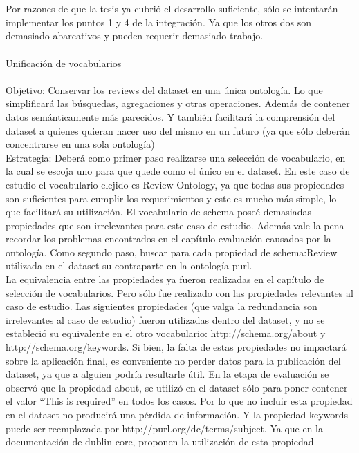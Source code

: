 \\
\\
Por razones de que la tesis ya cubrió el desarrollo suficiente, sólo se intentarán implementar los puntos 1 y 4 de la integración. Ya que 
los otros dos son demasiado abarcativos y pueden requerir demasiado trabajo.\\
\\
Unificación de vocabularios\\
\\
Objetivo: Conservar los reviews del dataset en una única ontología. Lo que simplificará las búsquedas, agregaciones y otras operaciones.
Además de contener datos semánticamente más parecidos. Y también facilitará la comprensión del dataset a quienes quieran hacer uso del mismo
en un futuro (ya que sólo deberán concentrarse en una sola ontología)
\\
Estrategia: Deberá como primer paso realizarse una selección de vocabulario, en la cual se escoja uno para que quede como el único en el dataset.
En este caso de estudio el vocabulario elejido es Review Ontology, ya que todas sus propiedades son suficientes para cumplir los requerimientos y 
este es mucho más simple, lo que facilitará su utilización. El vocabulario de schema poseé demasiadas propiedades que son irrelevantes para este caso de estudio. 
Además vale la pena recordar los problemas encontrados en el capítulo evaluación causados por la ontología.
Como segundo paso, buscar para cada propiedad de schema:Review utilizada en el dataset su contraparte en la ontología purl.\\
La equivalencia entre las propiedades ya fueron realizadas en el capítulo de selección de vocabularios. Pero sólo fue realizado con las propiedades 
relevantes al caso de estudio. Las siguientes propiedades (que valga la redundancia son irrelevantes al caso de estudio) fueron utilizadas dentro del dataset, y 
no se estableció su equivalente en el otro vocabulario:
http://schema.org/about y http://schema.org/keywords. 
Si bien, la falta de estas propiedades no impactará sobre la aplicación final, es conveniente no perder datos para la publicación del dataset, ya que 
a alguien podría resultarle útil. 
En la etapa de evaluación se observó que la propiedad about, se utilizó en el dataset sólo para poner contener el valor ``This is required'' en todos los casos. 
Por lo que no incluir esta propiedad en el dataset no producirá una pérdida de información.
Y la propiedad keywords puede ser reemplazada por http://purl.org/dc/terms/subject. Ya que en la documentación de dublin core, proponen la utilización de esta propiedad 
